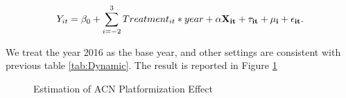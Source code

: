 \documentclass[12pt]{article}
\begin{document}
\begin{equation}
    Y_{it}  = \beta_0 + \sum_{i=-2}^3 Treatment_{it} * year + \bf{\alpha} \bf{X}_{it} + \tau_{it} + \mu_i + \epsilon_{it}. \label{eq:acn_assessment}
\end{equation}

We treat the year 2016 as the base year, and other settings are consistent with previous table \ref{tab:Dynamic}. The result is reported in Figure \ref{fig:dynamic_effect}

\begin{figure}[ht]
    \centering
    \hfill %
    \hfill %
    \caption{Estimation of ACN Platformization Effect}
    \label{fig:dynamic_effect}
\end{figure}
\end{document}
